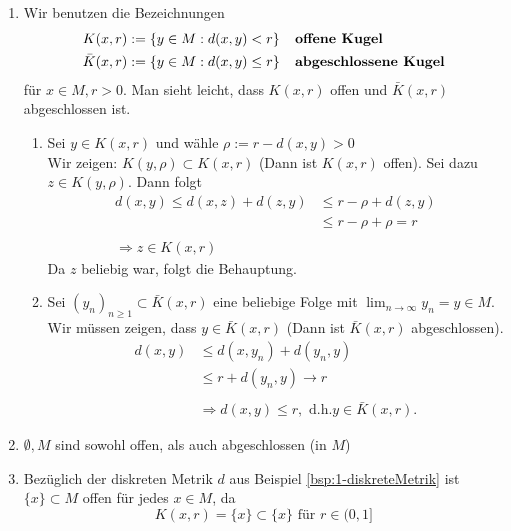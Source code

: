 \begin{bemerkung}
	\begin{enumerate}[label=\alph*\upshape)] 
		\item Wir benutzen die Bezeichnungen
			\begin{align*}
				K(x, r) & := \{ y \in M: d(x, y) < r \} \hspace{0.25cm} \text{\textbf{ offene Kugel}} \\
				\bar K(x, r) & := \{ y \in M: d(x, y) \leq r \} \hspace{0.25cm}  \text{\textbf{ abgeschlossene Kugel}}
			\end{align*}
			für $x \in M, r > 0$. Man sieht leicht, dass $K(x, r)$ offen und $\bar K(x, r)$ abgeschlossen ist.
		\begin{beweis}
			\begin{enumerate}
			\item Sei $y \in K(x, r)$ und wähle $\rho := r - d(x, y) > 0$ \\
				Wir zeigen: $K(y, \rho) \subset K(x, r)$ (Dann ist $K(x, r)$ offen). Sei dazu $z \in K(y, \rho)$. Dann folgt 
				\begin{align*}
					d(x, y) \leq d(x, z) + d(z,y) & \leq r - \rho + d(z, y) \\
												  & \leq r - \rho + \rho = r \\ \\
								\Rightarrow z \in K(x, r)
				\end{align*} 
				Da $z$ beliebig war, folgt die Behauptung.
			\item Sei $(y_{n})_{n \geq 1} \subset \bar K(x, r)$ eine beliebige Folge mit $ \lim_{n \rightarrow \infty} y_{n} = y \in M$. Wir müssen zeigen, dass $y \in \bar K(x, r)$ (Dann ist $\bar K(x, r)$ abgeschlossen). \\
				\begin{align*}
					d(x, y) & \leq d(x, y_{n}) + d(y_{n}, y) \\
							& \leq r + d(y_{n}, y) \rightarrow r \\ \\
						& \Rightarrow d(x, y) \leq r, \text{ d.h.} y \in \bar K(x, r).
				\end{align*} 
			\end{enumerate}	
		\end{beweis}
		\item $\emptyset, M$ sind sowohl offen, als auch abgeschlossen (in $M$)
		\item Bezüglich der diskreten Metrik $d$ aus Beispiel \eqref{bsp:1-diskreteMetrik} ist $\{x\} \subset M$ offen für jedes $x \in M$, da
			\[ K(x, r) = \{ x \} \subset \{ x \} \text{ für } r \in (0, 1] \]
	\end{enumerate}	
\end{bemerkung}

